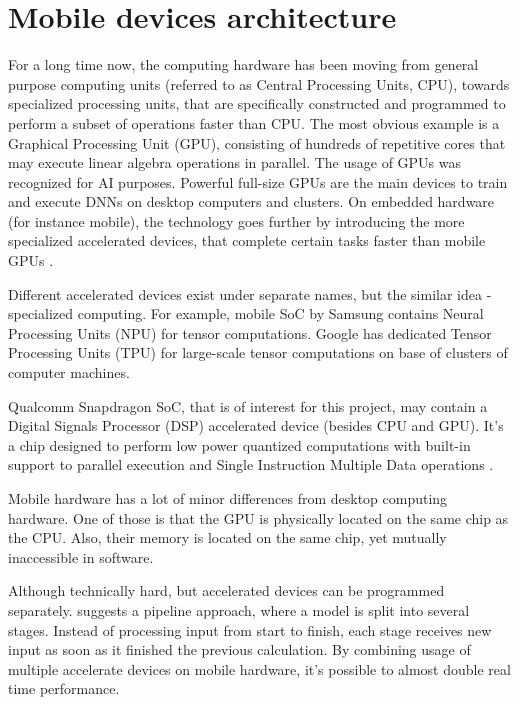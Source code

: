 \section{Mobile devices architecture}
\label{lit:mobile}

For a long time now, the computing hardware has been moving from general purpose computing units (referred to as Central Processing Units, CPU), towards specialized processing units, that are specifically constructed and programmed to perform a subset of operations faster than CPU. The most obvious example is a Graphical Processing Unit (GPU), consisting of hundreds of repetitive cores that may execute linear algebra operations in parallel. The usage of GPUs was recognized for AI purposes. Powerful full-size GPUs are the main devices to train and execute DNNs on desktop computers and clusters. On embedded hardware (for instance mobile), the technology goes further by introducing the more specialized accelerated devices, that complete certain tasks faster than mobile GPUs \cite{mobile:dl-review19}.

Different accelerated devices exist under separate names, but the similar idea - specialized computing. For example, mobile SoC by Samsung contains Neural Processing Units (NPU) for tensor computations. Google has dedicated Tensor Processing Units (TPU) for large-scale tensor computations on base of clusters of computer machines.

Qualcomm Snapdragon SoC, that is of interest for this project, may contain a Digital Signals Processor (DSP) accelerated device (besides CPU and GPU). It's a chip designed to perform low power quantized computations with built-in support to parallel execution and Single Instruction Multiple Data operations \cite{speed:online-dsp-qualcomm}.

Mobile hardware has a lot of minor differences from desktop computing hardware. One of those is that the GPU is physically located on the same chip as the CPU. Also, their memory is located on the same chip, yet mutually inaccessible in software.

Although technically hard, but accelerated devices can be programmed separately. \cite{mobile:pipelining20} suggests a pipeline approach, where a model is split into several stages. Instead of processing input from start to finish, each stage receives new input as soon as it finished the previous calculation. By combining usage of multiple accelerate devices on mobile hardware, it's possible to almost double real time performance.
